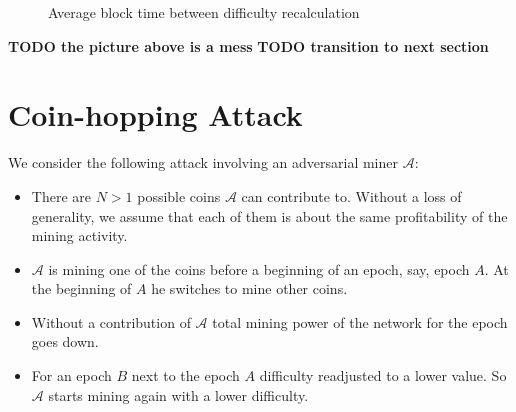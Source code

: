 \documentclass[]{llncs}
\newcommand{\AttackName}{Coin-hopping Attack}
\begin{document}
\begin{figure}[H]
\caption{Average block time between difficulty recalculation}
\label{fig:image}
\end{figure}

\textbf{TODO the picture above is a mess}
\textbf{TODO transition to next section}

\section{\AttackName}
\label{sec:attack}

We consider the following attack involving an adversarial miner $\mathcal{A}$:

\begin{itemize}
\item There are $N > 1$ possible coins $\mathcal{A}$ can contribute to. Without a loss of generality, we assume that each of them is about the same profitability of the mining activity. 
\item $\mathcal{A}$ is mining one of the coins before a beginning of an epoch, say, epoch $A$. At the beginning of $A$ he switches to mine other coins. 
\item Without a contribution of $\mathcal{A}$ total mining power of the network for the epoch goes down. 
\item For an epoch $B$ next to the epoch $A$ difficulty readjusted to a lower value. So $\mathcal{A}$ starts mining again with a lower difficulty. 
\end{itemize}
\end{document}

